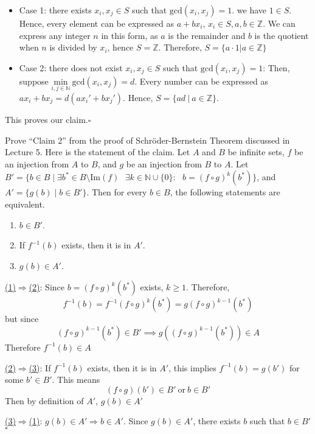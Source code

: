 \documentclass[12pt,answers]{exam}
\begin{document}
\begin{questions}
\begin{solution}
\begin{itemize}
    \item Case 1: there exists $x_i, x_j \in S$ such that $\text{gcd}(x_i,x_j) = 1$. we have $1 \in S$. Hence, every element can be expressed as $a + bx_i$, $x_i \in S, a,b \in \mathbb{Z}$. We can express any integer $n$ in this form, as $a$ is the remainder and $b$ is the quotient when $n$ is divided by $x_i$, hence $S = \mathbb{Z}$. Therefore, $S = \{ a \cdot 1 | a \in \mathbb{Z}\}$
    \item Case 2: there does not exist $x_i, x_j \in S$ such that $\text{gcd}(x_i,x_j) = 1$: Then, suppose $\underset{i,j \in \mathbb{N}}{\text{min}}\ \text{gcd}(x_i,x_j) = d$. Every number can be expressed as $ax_i + bx_j = d(ax_i' + bx_j')$. Hence, $S = \{ad\ |\ a \in \mathbb{Z}\}$.
\end{itemize}

This proves our claim.\hfill $\square$
\end{solution}

\question Prove ``Claim 2'' from the proof of Schr\"{o}der-Bernstein Theorem discussed in Lecture 5. Here is the statement of the claim. Let $A$ and $B$ be infinite sets, $f$ be an injection from $A$ to $B$, and $g$ be an injection from $B$ to $A$. Let $B'=\{b\in B\mid\exists b^*\in B\setminus\text{Im}(f)\text{ }\exists k\in\mathbb{N}\cup\{0\}:\text{ }b=(f\circ g)^k(b^*)\}$, and $A'=\{g(b)\mid b\in B'\}$. Then for every $b\in B$, the following statements are equivalent.
\begin{enumerate}
\item $b\in B'$.
\item If $f^{-1}(b)$ exists, then it is in $A'$.
\item $g(b)\in A'$.
\end{enumerate}
\begin{solution}

\underline{(1)$\Rightarrow$(2)}: Since $b=(f\circ g)^k(b^*)$ exists, $k \geq 1$. Therefore, $$f^{-1}(b) = f^{-1}(f \circ g)^k (b^*) = g(f \circ g)^{k-1} (b^*)$$ but since $$(f \circ g)^{k-1} (b^*) \in B' \implies g((f \circ g)^{k-1} (b^*)) \in A$$ Therefore $f^{-1}(b) \in A$

\vspace{1em}
\underline{(2)$\Rightarrow$(3)}: If $f^{-1}(b)$ exists, then it is in $A'$, this implies $f^{-1}(b) = g(b')$ for some $b' \in B'$. This means 
$$(f \circ g)(b') \in B'\ \text{or}\ b \in B'$$
Then by definition of $A'$, $g(b) \in A'$

\vspace{1em}
\underline{(3)$\Rightarrow$(1)}: $g(b)\in A' \Rightarrow b \in A'$. Since $g(b) \in A'$, there exists $b$ such that $b \in B'$ \hfill $\square$
\end{solution}


\end{questions}
\end{document}
